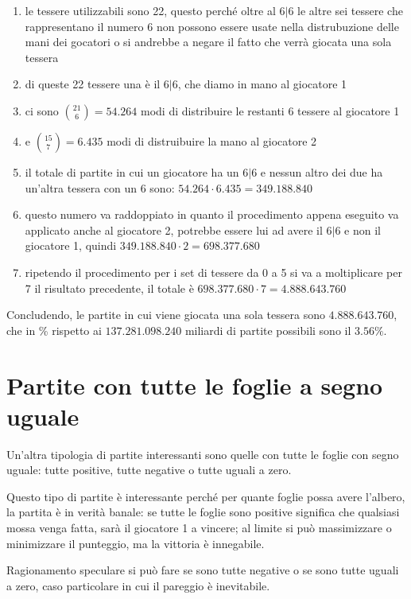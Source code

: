 \documentclass[a4paper,12pt]{report}
\begin{document}
\begin{enumerate}
    \item le tessere utilizzabili sono 22, questo perché oltre al \(6|6\) le altre sei tessere che rappresentano il numero 6 non possono essere usate nella distrubuzione delle mani dei gocatori o si andrebbe a negare il fatto che verrà giocata una sola tessera 
    \item di queste 22 tessere una è il \(6|6\), che diamo in mano al giocatore 1
    \item ci sono \(\binom{21}{6} = 54.264\) modi di distribuire le restanti 6 tessere al giocatore 1
    \item e \(\binom{15}{7} = 6.435\) modi di distruibuire la mano al giocatore 2
    \item il totale di partite in cui un giocatore ha un \(6|6\) e nessun altro dei due ha un'altra tessera con un 6 sono: \(54.264 \cdot 6.435 = 349.188.840\)
    \item questo numero va raddoppiato in quanto il procedimento appena eseguito va applicato anche al giocatore 2, potrebbe essere lui ad avere il \(6|6\) e non il giocatore 1, quindi \(349.188.840 \cdot 2 = 698.377.680\)
    \item ripetendo il procedimento per i set di tessere da 0 a 5 si va a moltiplicare per 7 il risultato precedente, il totale è \(698.377.680 \cdot 7 = 4.888.643.760\)
\end{enumerate}

Concludendo, le partite in cui viene giocata una sola tessera sono \(4.888.643.760\), che in \% rispetto ai \(137.281.098.240\) miliardi di partite possibili sono il \(3.56\%\).


\section{Partite con tutte le foglie a segno uguale}

Un'altra tipologia di partite interessanti sono quelle con tutte le foglie con segno uguale: tutte positive, tutte negative o tutte uguali a zero.

Questo tipo di partite è interessante perché per quante foglie possa avere l'albero, la partita è in verità banale: se tutte le foglie sono positive significa che qualsiasi mossa venga fatta, sarà il giocatore 1 a vincere; al limite si può massimizzare o minimizzare il punteggio, ma la vittoria è innegabile.

Ragionamento speculare si può fare se sono tutte negative o se sono tutte uguali a zero, caso particolare in cui il pareggio è inevitabile.
\end{document}
